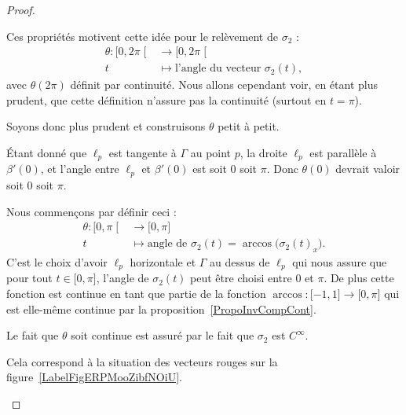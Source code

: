 \begin{proof}
\begin{subproof}
		Ces propriétés motivent cette idée pour le relèvement de \( \sigma_2\) :
		\begin{equation}
			\begin{aligned}
				\theta\colon \mathopen[ 0 , 2\pi \mathclose[ & \to\mathopen[ 0 , 2\pi \mathclose[              \\
				t                                            & \mapsto \text{l'angle du vecteur } \sigma_2(t),
			\end{aligned}
		\end{equation}
		avec \( \theta(2\pi)\) définit par continuité. Nous allons cependant voir, en étant plus prudent, que cette définition n'assure pas la continuité (surtout en \( t=\pi\)).

		Soyons donc plus prudent et construisons \( \theta\) petit à petit.

		Étant donné que \( \ell_p\) est tangente à \( \Gamma\) au point \(p \), la droite \( \ell_p\) est parallèle à \( \beta'(0)\), et l'angle entre \( \ell_p\) et \( \beta'(0)\) est soit \( 0\) soit \( \pi\). Donc \( \theta(0)\) devrait valoir soit \(0\) soit \(\pi\).

		Nous commençons par définir ceci :
		\begin{equation}
			\begin{aligned}
				\theta\colon \mathopen[ 0 , \pi \mathclose[ & \to \mathopen[ 0 , \pi \mathclose]                                        \\
				t                                           & \mapsto \text{angle de } \sigma_2(t)=\arccos\big(  \sigma_2(t)_x   \big).
			\end{aligned}
		\end{equation}
		C'est le choix d'avoir \( \ell_p\) horizontale et \( \Gamma\) au dessus de \( \ell_p\) qui nous assure que pour tout \( t\in\mathopen[ 0 , \pi \mathclose]\), l'angle de \( \sigma_2(t)\) peut être choisi entre \( 0\) et \( \pi\). De plus cette fonction est continue en tant que partie de la fonction \( \arccos\colon \mathopen[ -1 , 1 \mathclose]\to \mathopen[ 0 , \pi \mathclose]\) qui est elle-même continue par la proposition~\ref{PropoInvCompCont}.

		Le fait que \( \theta\) soit continue est assuré par le fait que \( \sigma_2\) est \(  C^{\infty}\).

		\begin{subproof}
			\spitem[Si \( \theta(0)=0\)]

			Cela correspond à la situation des vecteurs rouges sur la figure~\ref{LabelFigERPMooZibfNOiU}.


\end{subproof}
\end{subproof}
\end{proof}
